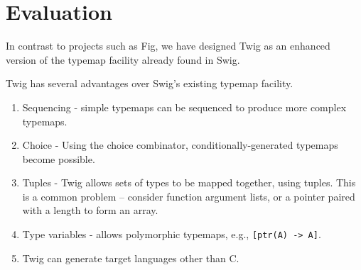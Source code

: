 
\section{Evaluation}

In contrast to projects such as Fig, we have designed Twig as an enhanced version of the typemap facility already found in Swig.

Twig has several advantages over Swig's existing typemap facility.

\begin{enumerate}
  \item Sequencing - simple typemaps can be sequenced to produce more complex typemaps.
  \item Choice - Using the choice combinator, conditionally-generated typemaps become possible.
  \item Tuples - Twig allows sets of types to be mapped together, using tuples. This is a common problem -- consider function argument lists, or a pointer paired with a length to form an array.
  \item Type variables - allows polymorphic typemaps, e.g., \texttt{[ptr(A) -> A]}.
  \item Twig can generate target languages other than C.
\end{enumerate}

